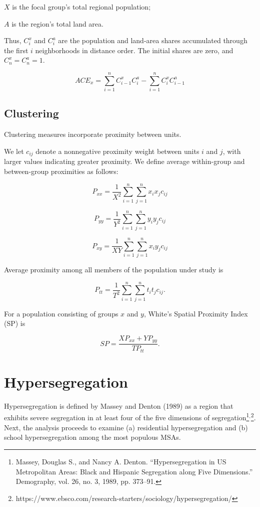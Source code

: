 \documentclass{report}[11pt,letterpaper]
\begin{document}
$X$ is the
focal group's total regional population; 

$A$ is
the region's total land area. 

Thus, $C_i^x$ and $C_i^a$ are the population and land-area
shares accumulated through the first $i$ neighborhoods
in distance order. The initial shares are zero, and
$C_n^x=C_n^a=1$.

\begin{equation}
ACE_x =
\sum_{i=1}^{n} C_{i-1}^x C_i^a
-
\sum_{i=1}^{n} C_i^x C_{i-1}^a
\end{equation}

\subsection{Clustering}

Clustering measures incorporate proximity between units.

We let $c_{ij}$ denote a nonnegative proximity weight between
units $i$ and $j$, with larger values indicating greater
proximity. We define average within-group and between-group
proximities as follows:

\begin{equation}
P_{xx} =
\dfrac{1}{X^2}
\sum_{i=1}^{n} \sum_{j=1}^{n}
x_i x_j c_{ij}
\end{equation}

\begin{equation}
P_{yy} =
\dfrac{1}{Y^2}
\sum_{i=1}^{n} \sum_{j=1}^{n}
y_i y_j c_{ij}
\end{equation}

\begin{equation}
P_{xy} =
\dfrac{1}{XY}
\sum_{i=1}^{n} \sum_{j=1}^{n}
x_i y_j c_{ij}
\end{equation}

Average proximity among all members of the population
under study is

\begin{equation}
P_{tt} =
\dfrac{1}{T^2}
\sum_{i=1}^{n} \sum_{j=1}^{n}
t_i t_j c_{ij}.
\end{equation}

For a population consisting of groups $x$ and $y$,
White's Spatial Proximity Index (SP) is

\begin{equation}
SP =
\dfrac{X P_{xx} + Y P_{yy}}{T P_{tt}}.
\end{equation}

\section{Hypersegregation}

Hypersegregation is defined by Massey and Denton (1989) as a region that exhibits severe segregation in at least four of the five dimensions of segregation\footnote{Massey, Douglas S., and Nancy A. Denton. “Hypersegregation in US Metropolitan Areas: Black and Hispanic Segregation along Five Dimensions.” Demography, vol. 26, no. 3, 1989, pp. 373–91.}$^{,}$\footnote{https://www.ebsco.com/research-starters/sociology/hypersegregation/}. Next, the analysis proceeds to examine (a) residential hypersegregation and (b) school hypersegregation among the most populous MSAs.
\end{document}
